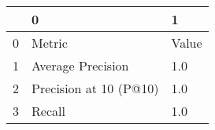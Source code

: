 \begin{tabular}{lll}
\toprule
{} &                       0 &         1 \\
\midrule
0 &                  Metric &     Value \\
1 &       Average Precision &       1.0 \\
2 &  Precision at 10 (P@10) &       1.0 \\
3 &                  Recall &       1.0 \\
\bottomrule
\end{tabular}
